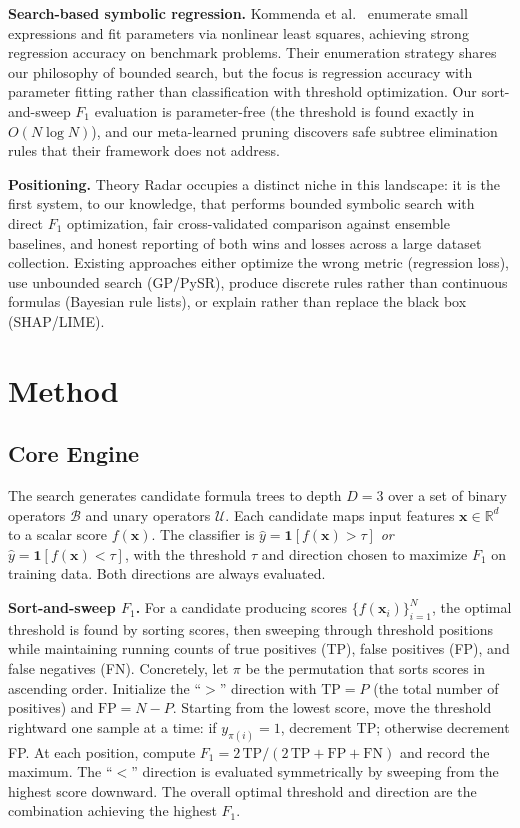 \documentclass[journal]{IEEEtran}
\begin{document}
\textbf{Search-based symbolic regression.}
Kommenda et al.~\cite{kommenda2020search} enumerate small expressions
and fit parameters via nonlinear least squares, achieving strong
regression accuracy on benchmark problems.  Their enumeration
strategy shares our philosophy of bounded search, but the focus is
regression accuracy with parameter fitting rather than classification
with threshold optimization.  Our sort-and-sweep $F_1$ evaluation is
parameter-free (the threshold is found exactly in $O(N \log N)$),
and our meta-learned pruning discovers safe subtree elimination rules
that their framework does not address.

\textbf{Positioning.}
Theory Radar occupies a distinct niche in this landscape: it is the
first system, to our knowledge, that performs bounded symbolic search
with direct $F_1$ optimization, fair cross-validated comparison
against ensemble baselines, and honest reporting of both wins and
losses across a large dataset collection.  Existing approaches either
optimize the wrong metric (regression loss), use unbounded search
(GP/PySR), produce discrete rules rather than continuous formulas
(Bayesian rule lists), or explain rather than replace the black box
(SHAP/LIME).

\section{Method}
\label{sec:method}

\subsection{Core Engine}
\label{sec:core}

The search generates candidate formula trees to depth $D = 3$ over a
set of binary operators $\mathcal{B}$ and unary operators
$\mathcal{U}$.  Each candidate maps input features
$\mathbf{x} \in \mathbb{R}^d$ to a scalar score $f(\mathbf{x})$.
The classifier is
$\hat{y} = \mathbf{1}[f(\mathbf{x}) > \tau]$ \emph{or}
$\hat{y} = \mathbf{1}[f(\mathbf{x}) < \tau]$, with the threshold
$\tau$ and direction chosen to maximize $F_1$ on training data.
Both directions are always evaluated.

\textbf{Sort-and-sweep $F_1$.}
For a candidate producing scores $\{f(\mathbf{x}_i)\}_{i=1}^N$,
the optimal threshold is found by sorting scores, then sweeping
through threshold positions while maintaining running counts of
true positives (TP), false positives (FP), and false negatives (FN).
Concretely, let $\pi$ be the permutation that sorts scores in
ascending order.  Initialize the ``$>$'' direction with
$\mathrm{TP} = P$ (the total number of positives) and $\mathrm{FP} = N - P$.
Starting from the lowest score, move the threshold rightward one
sample at a time: if $y_{\pi(i)} = 1$, decrement TP; otherwise
decrement FP.  At each position, compute
$F_1 = 2\,\mathrm{TP} / (2\,\mathrm{TP} + \mathrm{FP} + \mathrm{FN})$
and record the maximum.  The ``$<$'' direction is evaluated
symmetrically by sweeping from the highest score downward.  The
overall optimal threshold and direction are the combination
achieving the highest $F_1$.
\end{document}
